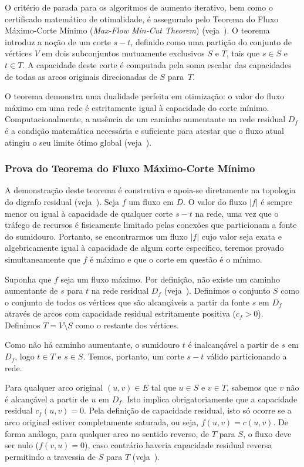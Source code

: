 \documentclass[12pt,a4paper]{article}
\begin{document}
O critério de parada para os algoritmos de aumento iterativo, bem como o certificado matemático de otimalidade, é assegurado pelo Teorema do Fluxo Máximo-Corte Mínimo (\textit{Max-Flow Min-Cut Theorem}) (veja~\cite{ford1956maximal}). O teorema introduz a noção de um corte $s-t$, definido como uma partição do conjunto de vértices $V$ em dois subconjuntos mutuamente exclusivos $S$ e $T$, tais que $s \in S$ e $t \in T$. A capacidade deste corte é computada pela soma escalar das capacidades de todas as arcos originais direcionadas de $S$ para~$T$.

O teorema demonstra uma dualidade perfeita em otimização: o valor do fluxo máximo em uma rede é estritamente igual à capacidade do corte mínimo. Computacionalmente, a ausência de um caminho aumentante na rede residual $D_f$ é a condição matemática necessária e suficiente para atestar que o fluxo atual atingiu o seu limite ótimo global (veja~\cite{cook1998combinatorial}).

\subsubsection{Prova do Teorema do Fluxo Máximo-Corte Mínimo}

A demonstração deste teorema é construtiva e apoia-se diretamente na topologia do digrafo residual (veja~\cite{ford1956maximal, cook1998combinatorial}). Seja $f$ um fluxo em $D$. O valor do fluxo $|f|$ é sempre menor ou igual à capacidade de qualquer corte $s-t$ na rede, uma vez que o tráfego de recursos é fisicamente limitado pelas conexões que particionam a fonte do sumidouro. Portanto, se encontrarmos um fluxo $|f|$ cujo valor seja exata e algebricamente igual à capacidade de algum corte específico, teremos provado simultaneamente que $f$ é máximo e que o corte em questão é o mínimo.

Suponha que $f$ seja um fluxo máximo. Por definição, não existe um caminho aumentante de $s$ para $t$ na rede residual $D_f$ (veja~\cite{ahuja1993network}). Definimos o conjunto $S$ como o conjunto de todos os vértices que são alcançáveis a partir da fonte $s$ em $D_f$ através de arcos com capacidade residual estritamente positiva ($c_f > 0$). Definimos $T = V \setminus S$ como o restante dos vértices.

Como não há caminho aumentante, o sumidouro $t$ é inalcançável a partir de $s$ em $D_f$, logo $t \in T$ e $s \in S$. Temos, portanto, um corte $s-t$ válido particionando a rede.

Para qualquer arco original $(u,v) \in E$ tal que $u \in S$ e $v \in T$, sabemos que $v$ não é alcançável a partir de $u$ em $D_f$. Isto implica obrigatoriamente que a capacidade residual $c_f(u,v) = 0$. Pela definição de capacidade residual, isto só ocorre se a arco original estiver completamente saturada, ou seja, $f(u,v) = c(u,v)$. De forma análoga, para qualquer arco no sentido reverso, de $T$ para $S$, o fluxo deve ser nulo ($f(v,u) = 0$), caso contrário haveria capacidade residual reversa permitindo a travessia de $S$ para $T$ (veja~\cite{cook1998combinatorial}).
\end{document}
